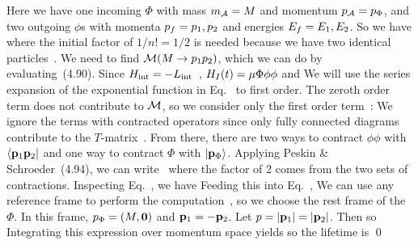 {	Here we have one incoming $\Phi$ with mass $m_{\mathcal{A}} = M$ and momentum $p_{\mathcal{A}} = p_\Phi$, and two outgoing $\phi$s with  momenta $p_f = p_1, p_2$ and energies $E_f = E_1, E_2$.  So we have
	where the initial factor of $1/n! = 1/2$ is needed because we have two identical particles~\cite[p.~108]{Peskin}.  We need to find $\mathcal{M}(M \to p_1 p_2)$, which we can do by evaluating~(4.90).  Since $H_\text{int} = -L_\text{int}$~\cite[p.~77]{Peskin}, $H_I(t) = \mu \Phi \phi \phi$ and
	We will use the series expansion of the exponential function in Eq.~ to first order.  The zeroth order term does not contribute to $\mathcal{M}$, so we consider only the first order term~\cite[p.~110]{Peskin}:
	We ignore the terms with contracted operators since only fully connected diagrams contribute to the $T$-matrix~\cite[p.~111]{Peskin}.  From there, there are two ways to contract $\phi \phi$ with $\bra{\vb{p}_1 \vb{p}_2}$ and one way to contract $\Phi$ with $\ket{\vb{p}_\Phi}$.  Applying Peskin \& Schroeder~(4.94),
	we can write~\cite[p.~112]{Peskin}
	where the factor of 2 comes from the two sets of contractions.  Inspecting Eq.~, we have
	Feeding this into Eq.~,
	We can use any reference frame to perform the computation~\cite[p.~100]{Peskin}, so we choose the rest frame of the $\Phi$.  In this frame, $p_\Phi = (M, \mathbf{0})$ and $\vb{p}_1 = -\vb{p}_2$.  Let $p = \abs{\vb{p}_1} = \abs{\vb{p}_2}$.  Then
	so
	Integrating this expression over momentum space yields
	so the lifetime is
	\qed
}